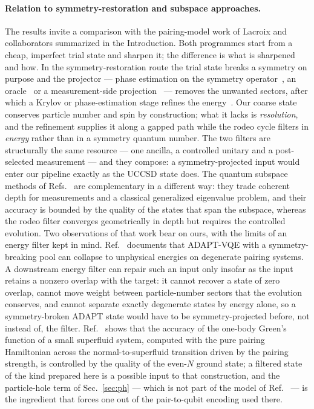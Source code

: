 \documentclass[
  aps,            %
  prc,            %
  reprint,        %
  superscriptaddress,
  floatfix,
  nofootinbib
]{revtex4-2}
\begin{document}
\paragraph{Relation to symmetry-restoration and subspace approaches.}
The results invite a comparison with the pairing-model work of Lacroix and
collaborators summarized in the Introduction.  Both programmes start from a
cheap, imperfect trial state and sharpen it; the difference is what is
sharpened and how.  In the symmetry-restoration route the trial state breaks a
symmetry on purpose and the projector --- phase estimation on the symmetry
operator~\cite{Lacroix2020}, an oracle~\cite{RuizGuzman2023} or a
measurement-side projection~\cite{RuizGuzman2024} --- removes the unwanted
sectors, after which a Krylov or phase-estimation stage refines the
energy~\cite{RuizGuzman2022}.  Our coarse state conserves particle number and
spin by construction; what it lacks is \emph{resolution}, and the refinement
supplies it along a gapped path while the rodeo cycle filters in
\emph{energy} rather than in a symmetry quantum number.  The two filters are
structurally the same resource --- one ancilla, a controlled unitary and a
post-selected measurement --- and they compose: a symmetry-projected input
would enter our pipeline exactly as the UCCSD state does.  The quantum
subspace methods of Refs.~\cite{Zhang2025,AychetClaisse2026,BeaujeaultTaudiere2024}
are complementary in a different way: they trade coherent depth for
measurements and a classical generalized eigenvalue problem, and their
accuracy is bounded by the quality of the states that span the subspace,
whereas the rodeo filter converges geometrically in depth but requires the
controlled evolution.  Two observations of that work bear on ours, with the
limits of an energy filter kept in mind.  Ref.~\cite{Zhang2024} documents that
ADAPT-VQE with a symmetry-breaking pool can collapse to unphysical energies on
degenerate pairing systems.  A downstream energy filter can repair such an
input only insofar as the input retains a nonzero overlap with the target:
it cannot recover a state of zero overlap, cannot move weight between
particle-number sectors that the evolution conserves, and cannot separate
exactly degenerate states by energy alone, so a symmetry-broken ADAPT state
would have to be symmetry-projected before, not instead of, the filter.
Ref.~\cite{AychetClaisse2026} shows that the accuracy of the one-body Green's
function of a small superfluid system, computed with the pure pairing
Hamiltonian across the normal-to-superfluid transition driven by the pairing
strength, is controlled by the quality of the even-$N$ ground state; a
filtered state of the kind prepared here is a possible input to that
construction, and the particle-hole term of Sec.~\ref{sec:ph} --- which is
not part of the model of Ref.~\cite{AychetClaisse2026} --- is the ingredient
that forces one out of the pair-to-qubit encoding used there.
\end{document}
